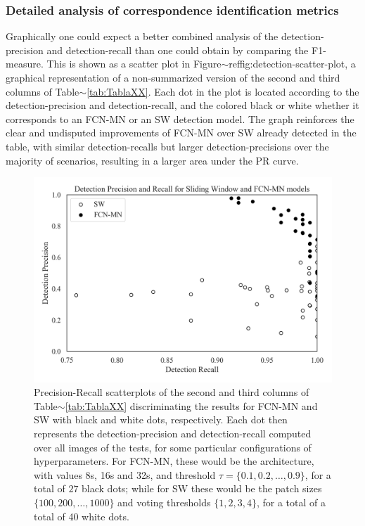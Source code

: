 \documentclass[a4paper,authoryear,review]{elsarticle}
\begin{document}
\subsubsection{Detailed analysis of correspondence identification metrics} 
\label{sub:compFCNSW}


Graphically one could expect a better combined analysis of the detection-precision and detection-recall than one could obtain by comparing the F1-measure. This is shown as a scatter plot in Figure$\sim$ref{fig:detection-scatter-plot}, a graphical representation of a non-summarized version of the second and third columns of Table$\sim$\ref{tab:TablaXX}. Each dot  in the plot is located according to the detection-precision and detection-recall, and the colored black or white whether it corresponds to an FCN-MN or an SW detection model.
%
The graph reinforces the clear and undisputed improvements of FCN-MN over SW already detected in the table, with similar detection-recalls but larger detection-precisions over the majority of scenarios, resulting in a larger area under the PR curve. 




 \begin{figure}
    \centering
    \includegraphics[width=\textwidth]{figures/111_precision_recall_detection.png}
    \caption{Precision-Recall scatterplots of the second and third columns of Table$\sim$\ref{tab:TablaXX} discriminating the results for FCN-MN and SW with black and white dots, respectively. Each dot then  represents the detection-precision and detection-recall computed over all images of the tests, for some particular  configurations of hyperparameters. For FCN-MN, these would be the architecture, with values 8s, 16s and 32s, and threshold $\tau = \{0.1, 0.2, \ldots, 0.9\}$,  for a total of $27$ black dots; while for SW these would be the patch sizes  $\{100, 200, \ldots, 1000\}$ and voting thresholds $\{1, 2, 3, 4\}$, for a total of a total of 40 white dots.}
    \label{fig:detection-scatter-plot}
\end{figure}
\end{document}

